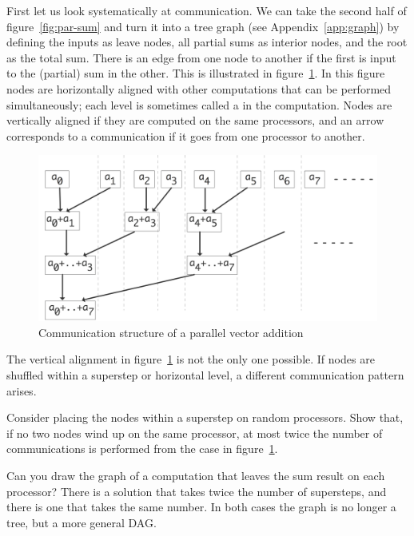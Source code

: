 First let us look systematically at communication. We can take the
second half of figure~\ref{fig:par-sum} and turn it into a tree graph
(see Appendix~\ref{app:graph}) by defining the inputs as leave nodes,
all partial sums as interior nodes, and the root as the total
sum. There is an edge from one node to another if the first is input
to the (partial) sum in the other. This is illustrated in
figure~\ref{fig:par-sum-graph}. In this figure nodes are horizontally
aligned with other computations that can be performed simultaneously;
each level is sometimes called a  in the computation.
Nodes are vertically aligned if they are computed on the same
processors, and an arrow corresponds to a communication if it goes
from one processor to another. 
\begin{figure}[ht]
  \includegraphics[scale=.13]{graphics-public/parallel-sum-graph}
  \caption{Communication structure of a parallel vector addition}
  \label{fig:par-sum-graph}
\end{figure}
The vertical alignment in figure~\ref{fig:par-sum-graph} is not the
only one possible. If nodes are shuffled within a superstep or
horizontal level, a different communication pattern arises.
\begin{exercise}
  Consider placing the nodes within a superstep on random
  processors. Show that, if no two nodes wind up on the same
  processor, at most twice the number of communications is performed
  from the case in figure~\ref{fig:par-sum-graph}.
\end{exercise}

\begin{exercise}
  Can you draw the graph of a computation that leaves the sum result
  on each processor? There is a solution that takes twice the number
  of supersteps, and there is one that takes the same number. In both
  cases the graph is no longer a tree, but a more general \ac{DAG}.
\end{exercise}

